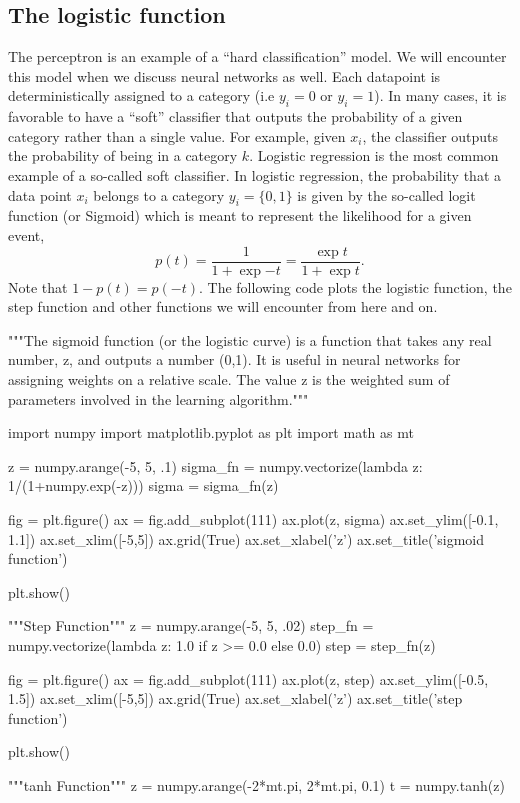 \documentclass[%
oneside,                 %
final,                   %
10pt]{article}
\begin{document}
\subsection{The logistic function}

The perceptron is an example of a ``hard classification'' model. We
will encounter this model when we discuss neural networks as
well. Each datapoint is deterministically assigned to a category (i.e
$y_i=0$ or $y_i=1$). In many cases, it is favorable to have a ``soft''
classifier that outputs the probability of a given category rather
than a single value. For example, given $x_i$, the classifier
outputs the probability of being in a category $k$.  Logistic regression
is the most common example of a so-called soft classifier. In logistic
regression, the probability that a data point $x_i$
belongs to a category $y_i=\{0,1\}$ is given by the so-called logit function (or Sigmoid) which is meant to represent the likelihood for a given event, 
\[
p(t) = \frac{1}{1+\mathrm \exp{-t}}=\frac{\exp{t}}{1+\mathrm \exp{t}}.
\]
Note that $1-p(t)= p(-t)$.
The following code plots the logistic function, the step function and other functions we will encounter from here and on.


\bpycod
"""The sigmoid function (or the logistic curve) is a
function that takes any real number, z, and outputs a number (0,1).
It is useful in neural networks for assigning weights on a relative scale.
The value z is the weighted sum of parameters involved in the learning algorithm."""

import numpy
import matplotlib.pyplot as plt
import math as mt

z = numpy.arange(-5, 5, .1)
sigma_fn = numpy.vectorize(lambda z: 1/(1+numpy.exp(-z)))
sigma = sigma_fn(z)

fig = plt.figure()
ax = fig.add_subplot(111)
ax.plot(z, sigma)
ax.set_ylim([-0.1, 1.1])
ax.set_xlim([-5,5])
ax.grid(True)
ax.set_xlabel('z')
ax.set_title('sigmoid function')

plt.show()

"""Step Function"""
z = numpy.arange(-5, 5, .02)
step_fn = numpy.vectorize(lambda z: 1.0 if z >= 0.0 else 0.0)
step = step_fn(z)

fig = plt.figure()
ax = fig.add_subplot(111)
ax.plot(z, step)
ax.set_ylim([-0.5, 1.5])
ax.set_xlim([-5,5])
ax.grid(True)
ax.set_xlabel('z')
ax.set_title('step function')

plt.show()

"""tanh Function"""
z = numpy.arange(-2*mt.pi, 2*mt.pi, 0.1)
t = numpy.tanh(z)
\end{document}

